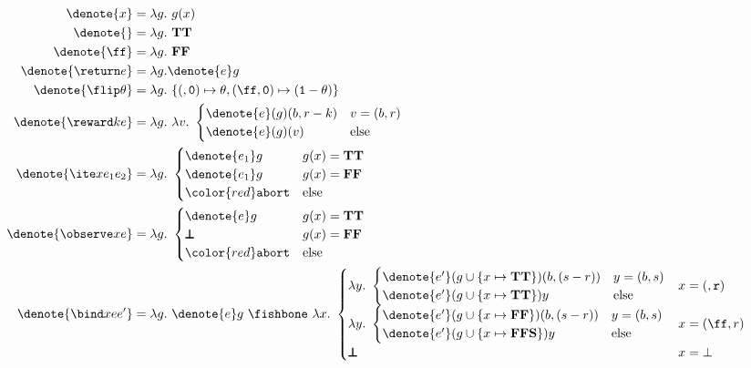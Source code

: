 \begin{align*}
  \denote{x} &= \lambda g . \ g(x)  \\
  \denote{\tt} &= \lambda g . \ \mathbf{TT} \\
  \denote{\ff} &= \lambda g . \ \mathbf{FF} \\
  \denote{\return e} &= \lambda g . \denote{e} g\ \\
  \denote{\flip \theta} &= \lambda g . \ \{(\tt,0) \mapsto \theta , (\ff,0) \mapsto (1 - \theta)\} \\
  \denote{\reward k e} &= \lambda g . \ 
    \lambda v. \ 
    \begin{cases}
      \denote{e}(g)(b, r-k) & v = (b, r) \\
      \denote{e}(g)(v)  & \text{else}
    \end{cases}  \\
  \denote{\ite x {e_1} {e_2}} 
    &= \lambda g . \ \begin{cases}
      \denote{e_1}g & g(x) = \mathbf{TT} \\
      \denote{e_1}g & g(x) = \mathbf{FF} \\
      {\color{red}\texttt{abort}} & \text{else}
    \end{cases} \\
  \denote{\observe x e} 
    &= \lambda g . \ \begin{cases}
      \denote{e}g & g(x) = \mathbf{TT} \\
      \pmb{\bot} & g(x) = \mathbf{FF} \\
      {\color{red}\texttt{abort}} & \text{else}
    \end{cases} \\
  \denote{\bind x e {e'}}
    &= \lambda g . \ \denote{e} g  \ \fishbone \
      \lambda x. \ \begin{cases}
        \lambda y . \ 
          \begin{cases}
            \denote{e'} (g \cup \{x \mapsto \mathbf{TT}\}) (b,(s-r)) & y = (b,s)\\
            \denote{e'} (g \cup \{x \mapsto \mathbf{TT}\}) y     & \text{else}
          \end{cases} & x = (\tt, r) \\
          \lambda y . \ 
          \begin{cases}
            \denote{e'} (g \cup \{x \mapsto \mathbf{FF}\}) (b,(s-r)) & y = (b,s)\\
            \denote{e'} (g \cup \{x \mapsto \mathbf{FFS}\}) y     & \text{else}
          \end{cases} & x = (\ff, r) \\
        \pmb{\bot} & x = \bot 
      \end{cases}
\end{align*}